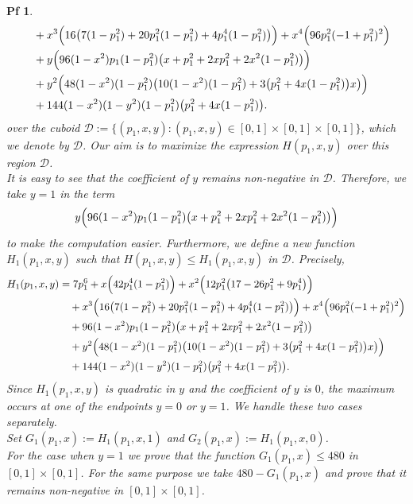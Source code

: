 \documentclass[10pt,a4paper]{amsart}
\newtheorem{pf}{Pf}
\begin{document}
\begin{pf}
\begin{align}
&\quad
+ x^{3}\Bigl(16\bigl(7(1-p_1^{2})+20p_1^{2}(1-p_1^{2})+4p_1^{4}(1-p_1^{2})\bigr)\Bigr)
+ x^{4}\Bigl(96p_1^{2}(-1+p_1^{2})^{2}\Bigr)\notag\\
&\quad
+ y\Bigl(96(1-x^{2})p_1(1-p_1^{2})\bigl(x+p_1^{2}+2xp_1^{2}+2x^{2}(1-p_1^{2})\bigr)\Bigr)\notag\\
&\quad
+ y^{2}\Bigl(48(1-x^{2})(1-p_1^{2})\bigl(10(1-x^{2})(1-p_1^{2})
+3\bigl(p_1^{2}+4x(1-p_1^{2})\bigr)x\bigr)\Bigr)\notag\\
&\quad
+ 144(1-x^{2})(1-y^{2})(1-p_1^{2})\bigl(p_1^{2}+4x(1-p_1^{2})\bigr).
\end{align}
over the cuboid $\mathcal{D}:=\{(p_1, x, y):(p_1, x, y)\in [0, 1] \times [0, 1] \times [0, 1]\}$, which we denote by $\mathcal{D}$. Our aim is to maximize the expression $H(p_1, x, y)$ over this region $\mathcal{D}$.\\[2mm]
It is easy to see that the coefficient of $y$ remains non-negative in $\mathcal{D}$. Therefore, we take $y=1$ in the term
\[
y\Bigl(96(1-x^{2})p_1(1-p_1^{2})\bigl(x+p_1^{2}+2xp_1^{2}+2x^{2}(1-p_1^{2})\bigr)\Bigr)
\]
to make the computation easier. Furthermore, we define a new function $H_{1}(p_1, x, y)$ such that $H(p_1, x, y) \leq H_{1}(p_1, x, y)$ in $\mathcal{D}$. Precisely,
\begin{align}\label{eq:3.24}
H_1(p_1,x,y)
&= 7p_1^{6}
+ x\Bigl(42p_1^{4}(1-p_1^{2})\Bigr)
+ x^{2}\Bigl(12p_1^{2}\bigl(17-26p_1^{2}+9p_1^{4}\bigr)\Bigr)\notag\\
&\quad
+ x^{3}\Bigl(16\bigl(7(1-p_1^{2})+20p_1^{2}(1-p_1^{2})+4p_1^{4}(1-p_1^{2})\bigr)\Bigr)
+ x^{4}\Bigl(96p_1^{2}(-1+p_1^{2})^{2}\Bigr)\notag\\
&\quad
+ 96(1-x^{2})p_1(1-p_1^{2})\bigl(x+p_1^{2}+2xp_1^{2}+2x^{2}(1-p_1^{2})\bigr)\notag\\
&\quad
+ y^{2}\Bigl(48(1-x^{2})(1-p_1^{2})\bigl(10(1-x^{2})(1-p_1^{2})
+3\bigl(p_1^{2}+4x(1-p_1^{2})\bigr)x\bigr)\Bigr)\notag\\
&\quad
+ 144(1-x^{2})(1-y^{2})(1-p_1^{2})\bigl(p_1^{2}+4x(1-p_1^{2})\bigr).
\end{align}
Since $H_{1}(p_{1}, x, y)$ is quadratic in $y$ and the coefficient of $y$ is $0$, the maximum occurs at one of the endpoints $y=0$ or $y=1$. We handle these two cases separately.\\[2mm]
Set $G_{1}(p_1, x):=H_{1}(p_{1}, x, 1)$ and $G_{2}(p_1, x):=H_{1}(p_{1}, x, 0)$. \\[2mm]
For the case when $y=1$ we prove that the function $G_{1}(p_1, x)\le 480$ in $[0, 1]\times[0, 1]$. For the same purpose we take $480-G_{1}(p_{1}, x)$ and prove that it remains non-negative in $[0, 1] \times[0, 1]$.\\

\end{pf}
\end{document}
